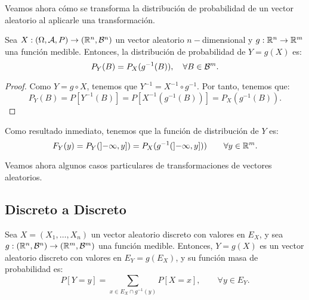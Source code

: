 Veamos ahora cómo se transforma la distribución de probabilidad de un vector aleatorio al aplicarle una transformación.
\begin{prop}
    Sea $X:(\Omega, \mathcal{A},P) \to (\mathbb{R}^n, \mathcal{B}^n)$ un vector aleatorio $n-$dimensional y $g:\mathbb{R}^n\to \mathbb{R}^m$ una función medible. Entonces, la distribución de probabilidad de $Y=g(X)$ es:
    \begin{equation*}
        P_Y(B) = P_X(g^{-1}(B)), \quad \forall B\in \mathcal{B}^m.
    \end{equation*}
\end{prop}
\begin{proof}
    Como $Y=g\circ X$, tenemos que $Y^{-1}=X^{-1}\circ g^{-1}$. Por tanto, tenemos que:
    \begin{equation*}
        P_Y(B) = P[Y^{-1}(B)] = P[X^{-1}(g^{-1}(B))] = P_X(g^{-1}(B)).
    \end{equation*}
\end{proof}

Como resultado inmediato, tenemos que la función de distribución de $Y$ es:
\begin{equation*}
    F_Y(y) = P_Y(\left]-\infty, y\right]) = P_X(g^{-1}(\left]-\infty, y\right]))   \qquad \forall y\in \mathbb{R}^m.
\end{equation*}

Veamos ahora algunos casos particulares de transformaciones de vectores aleatorios.

\subsection{Discreto a Discreto}

Sea $X=(X_1, \ldots, X_n)$ un vector aleatorio discreto con valores en $E_X$, y sea $g:(\mathbb{R}^n, \mathcal{B}^n)\to (\mathbb{R}^m, \mathcal{B}^m)$ una función medible. Entonces, $Y=g(X)$ es un vector aleatorio discreto con valores en $E_Y=g(E_X)$, y su función masa de probabilidad es:
\begin{equation*}
    P[Y=y] = \sum_{x\in E_X\cap g^{-1}(y)} P[X=x],\qquad \forall y\in E_Y.
\end{equation*}



